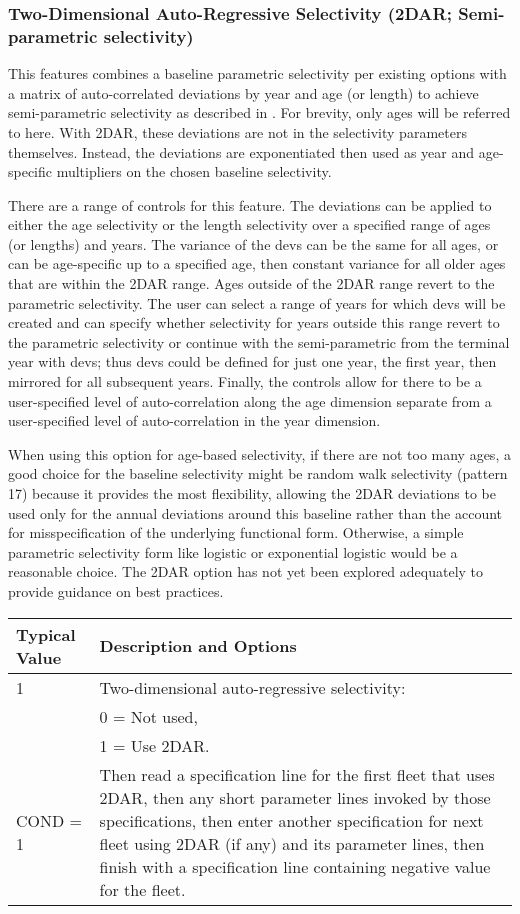 \subsubsection{Two-Dimensional Auto-Regressive Selectivity (2DAR; Semi-parametric selectivity)}
This features combines a baseline parametric selectivity per existing options with a matrix of auto-correlated deviations by year and age (or length) to achieve semi-parametric selectivity as described in \citet{xu-new-2019}. For brevity, only ages will be referred to here. With 2DAR, these deviations are not in the selectivity parameters themselves. Instead, the deviations are exponentiated then used as year and age-specific multipliers on the chosen baseline selectivity.

There are a range of controls for this feature. The deviations can be applied to either the age selectivity or the length selectivity over a specified range of ages (or lengths) and years. The variance of the devs can be the same for all ages, or can be age-specific up to a specified age, then constant variance for all older ages that are within the 2DAR range. Ages outside of the 2DAR range revert to the parametric selectivity. The user can select a range of years for which devs will be created and can specify whether selectivity for years outside this range revert to the parametric selectivity or continue with the semi-parametric from the terminal year with devs; thus devs could be defined for just one year, the first year, then mirrored for all subsequent years. Finally, the controls allow for there to be a user-specified level of auto-correlation along the age dimension separate from a user-specified level of auto-correlation in the year dimension.

When using this option for age-based selectivity, if there are not too many ages, a good choice for the baseline selectivity might be random walk selectivity (pattern 17) because it provides the most flexibility, allowing the 2DAR deviations to be used only for the annual deviations around this baseline rather than the account for misspecification of the underlying functional form. Otherwise, a simple parametric selectivity form like logistic or exponential logistic would be a reasonable choice. The 2DAR option has not yet been explored adequately to provide guidance on best practices.

\begin{tabular}{p{2cm} p{14cm}}
	\hline
	Typical Value & Description and Options \Tstrut\Bstrut\\
	\hline
	1 \Tstrut & Two-dimensional auto-regressive selectivity: \\
	  & 0 = Not used, \\
	  & 1 = Use 2DAR. \\
	COND = 1 & Then read a specification line for the first fleet that uses 2DAR, then any short parameter lines invoked by those specifications, then enter another specification for next fleet using 2DAR (if any) and its parameter lines, then finish with a specification line containing negative value for the fleet. \Bstrut\\
	\hline
\end{tabular}

